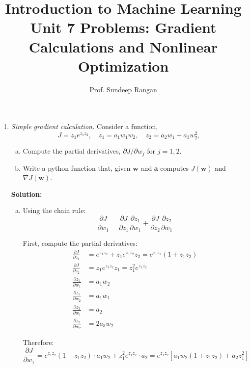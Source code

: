 \documentclass[11pt]{article}
\newcommand{\abf}{\mathbf{a}}
\newcommand{\wbf}{\mathbf{w}}
\begin{document}
\title{Introduction to Machine Learning\\
Unit 7 Problems:  Gradient Calculations and Nonlinear Optimization}
\author{Prof. Sundeep Rangan}
\date{}

\maketitle


\begin{enumerate}

\item \emph{Simple gradient calculation.}  Consider a function,
\[
    J = z_1e^{z_1z_2}, \quad z_1 = a_1w_1w_2, \quad z_2 = a_2w_1 + a_3w_2^2,
\]
\begin{enumerate}[(a)]
\item Compute the partial derivatives, $\partial J/\partial w_j$ for $j=1,2$.
\item Write a python function that, given $\wbf$ and $\abf$
computes $J(\wbf)$ and $\nabla J(\wbf)$.
\end{enumerate}

\textbf{Solution:}
\begin{enumerate}[(a)]
\item Using the chain rule:
$$\frac{\partial J}{\partial w_1} = \frac{\partial J}{\partial z_1}\frac{\partial z_1}{\partial w_1} + \frac{\partial J}{\partial z_2}\frac{\partial z_2}{\partial w_1}$$

First, compute the partial derivatives:
\begin{align}
\frac{\partial J}{\partial z_1} &= e^{z_1z_2} + z_1e^{z_1z_2}z_2 = e^{z_1z_2}(1 + z_1z_2)\\
\frac{\partial J}{\partial z_2} &= z_1e^{z_1z_2}z_1 = z_1^2e^{z_1z_2}\\
\frac{\partial z_1}{\partial w_1} &= a_1w_2\\
\frac{\partial z_1}{\partial w_2} &= a_1w_1\\
\frac{\partial z_2}{\partial w_1} &= a_2\\
\frac{\partial z_2}{\partial w_2} &= 2a_3w_2
\end{align}

Therefore:
$$\frac{\partial J}{\partial w_1} = e^{z_1z_2}(1 + z_1z_2) \cdot a_1w_2 + z_1^2e^{z_1z_2} \cdot a_2 = e^{z_1z_2}[a_1w_2(1 + z_1z_2) + a_2z_1^2]$$


\end{enumerate}
\end{enumerate}
\end{document}
